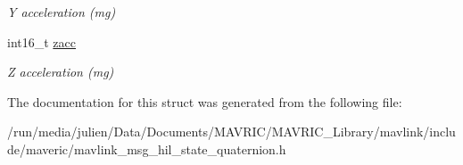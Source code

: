 \begin{DoxyCompactItemize}
\begin{DoxyCompactList}\small\item\em Y acceleration (mg) \end{DoxyCompactList}\item 
\hypertarget{struct____mavlink__hil__state__quaternion__t_a8e4533aa8c582bf609a813b65835fe52}{int16\+\_\+t \hyperlink{struct____mavlink__hil__state__quaternion__t_a8e4533aa8c582bf609a813b65835fe52}{zacc}}\label{struct____mavlink__hil__state__quaternion__t_a8e4533aa8c582bf609a813b65835fe52}

\begin{DoxyCompactList}\small\item\em Z acceleration (mg) \end{DoxyCompactList}\end{DoxyCompactItemize}


The documentation for this struct was generated from the following file\+:\begin{DoxyCompactItemize}
\item 
/run/media/julien/\+Data/\+Documents/\+M\+A\+V\+R\+I\+C/\+M\+A\+V\+R\+I\+C\+\_\+\+Library/mavlink/include/maveric/mavlink\+\_\+msg\+\_\+hil\+\_\+state\+\_\+quaternion.\+h\end{DoxyCompactItemize}
